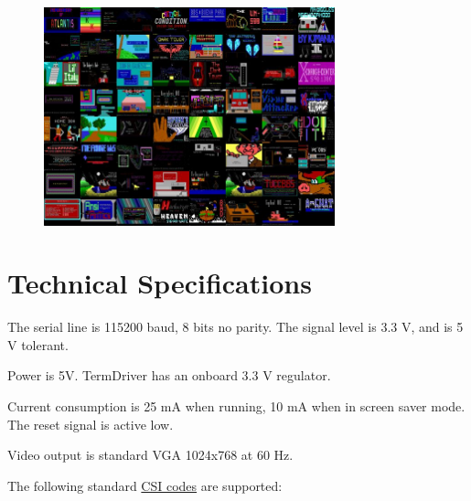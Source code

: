 \documentclass{article}
\begin{document}
\begin{figure}[h!]
  \centering
  \includegraphics[width=0.75\textwidth]{img/img5}
\end{figure}

\hypertarget{technical-specifications}{}
\hypertarget{technical-specifications}{%
\section{Technical Specifications}\label{technical-specifications}}

The serial line is 115200 baud, 8 bits no parity. The signal level is
3.3 V, and is 5 V tolerant.

Power is 5V. TermDriver has an onboard 3.3 V regulator.

Current consumption is 25 mA when running, 10 mA when in screen saver
mode. The reset signal is active low.

Video output is standard VGA 1024x768 at 60 Hz.

The following standard
\href{https://en.wikipedia.org/wiki/ANSI_escape_code\#CSI_sequences}{CSI
codes} are supported:
\end{document}
